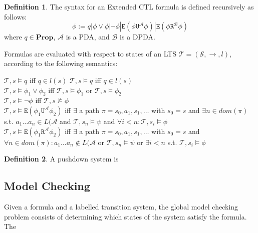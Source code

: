 \documentclass[11pt]{article}
\theoremstyle{definition}
\newtheorem{mydef}{Definition}
\begin{document}
\begin{mydef}
The syntax for an Extended CTL formula is defined recursively as follows:
   \[ \phi := q | \phi \vee \phi | \neg \phi | \texttt{E}(\phi \texttt{U}^\mathcal{A} \phi) | \texttt{E}(\phi
   \texttt{R}^\mathcal{B} \phi) \]
where $q \in \textbf{Prop}$, $\mathcal{A}$ is a PDA, and $\mathcal{B}$ is a DPDA.

Formulas are evaluated with respect to states of an LTS $\mathcal{T} = (\mathcal{S},
\rightarrow, l)$, according to the following semantics:

$\mathcal{T}, s \models q$ iff $q \in l(s)$
$\mathcal{T}, s \models q$ iff $q \in l(s)$ \\
$\mathcal{T}, s \models \phi_1 \vee \phi_2$ iff $\mathcal{T}, s \models \phi_1$
or $\mathcal{T}, s \models \phi_2$ \\
$\mathcal{T}, s \models \neg \phi $ iff $\mathcal{T}, s \not\models \phi$ \\
$\mathcal{T}, s \models \texttt{E}(\phi_1 \texttt{U}^\mathcal{A} \phi_2) $ iff 
$\exists$ a path $\pi = s_0, a_1, s_1, \dots$ with $s_0 = s$ and $\exists n \in dom(\pi)$ s.t. $a_1 \dots a_n \in L(\mathcal{A}$ and $\mathcal{T}, s_n \models \psi$ and $\forall i < n : \mathcal{T}, s_i \models \phi$
\\ %
$\mathcal{T}, s \models \texttt{E}(\phi_1 \texttt{R}^\mathcal{A} \phi_2) $ iff 
$\exists$ a path $\pi = s_0, a_1, s_1, \dots$ with $s_0 = s$ and $\forall n \in dom(\pi): a_1 \dots a_n \not\in L(\mathcal{A}$ or $\mathcal{T}, s_n \models \psi$ or $\exists i < n$ s.t. $\mathcal{T}, s_i \models \phi$\\ %
\end{mydef}

\begin{mydef} A pushdown system is \end{mydef}



\subsection{Model Checking}

Given a formula and a labelled transition system, the global model checking
problem consists of determining which states of the system satisfy the formula.
The %
\end{document}
